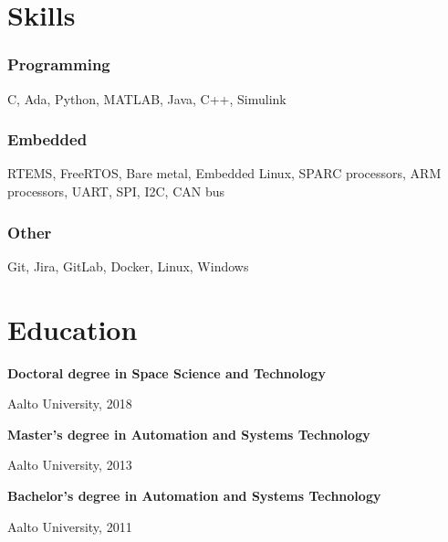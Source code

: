 \documentclass{article}
\newcommand{\degree}[3]{
\noindent
\textbf{#1}

#2, #3

\vspace{12pt}
}
\begin{document}
\begin{minipage}[t]{.22\textwidth}

\section*{Skills}

\subsubsection*{Programming}

C, Ada, Python, MATLAB, Java,  C++, Simulink

\subsubsection*{Embedded}

RTEMS, FreeRTOS, Bare metal, Embedded Linux, SPARC processors, ARM processors, UART, SPI, I2C, CAN bus

\subsubsection*{Other}

Git, Jira, GitLab, Docker, Linux, Windows

\section*{Education}

\degree{Doctoral degree in Space Science and Technology}{Aalto University}{2018}

\degree{Master's degree in Automation and Systems Technology}{Aalto University}{2013}

\degree{Bachelor's degree in Automation and Systems Technology}{Aalto University}{2011}

\end{minipage}%
\end{document}
